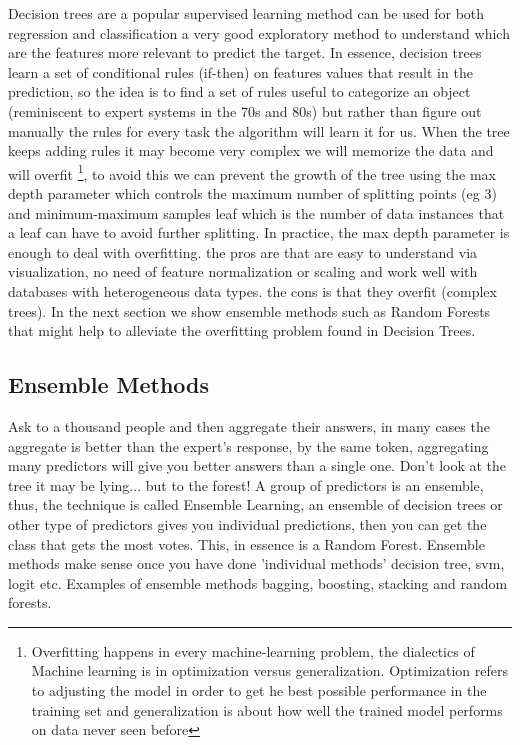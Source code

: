 \documentclass[11pt]{article}
\begin{document}
Decision trees are a popular supervised learning method can be used for both regression and classification  a very good exploratory method to understand which are the features more relevant to predict the target.
In essence, decision trees learn a set of conditional rules (if-then) on features values that result in the prediction, so the idea is to find a set of rules useful to categorize an object (reminiscent to expert systems in the 70s and 80s) but rather than figure out manually the rules for every task the algorithm will learn it for us.
When the tree keeps adding rules it may become very complex we will memorize the data and will overfit \footnote{Overfitting happens in every machine-learning problem, the dialectics of Machine learning is in optimization versus generalization. Optimization refers to adjusting the model in order to get he best possible performance in the training set and generalization is about how well the trained model performs on data never seen before}, to avoid this we can prevent the growth of the tree using the max depth parameter which controls the maximum number of splitting points (eg 3) and minimum-maximum samples leaf which is the number of data instances that a leaf can have to avoid further splitting.  In practice, the max depth parameter is enough to deal with overfitting.
the pros are that are easy to understand via visualization, no need of feature normalization or scaling and work well with databases with heterogeneous data types. the cons is that they overfit (complex trees). In the next section we show ensemble methods such as Random Forests that might help to alleviate the overfitting problem found in Decision Trees.

\subsection{Ensemble Methods}
Ask to a thousand people and then aggregate their answers, in many cases the aggregate is better than the expert's response, by the same token, aggregating many predictors will give you better answers than a single one.
Don't look at the tree it may be lying... but to the forest!
A group of predictors is an ensemble, thus, the technique is called Ensemble Learning, an ensemble of decision trees or other type of predictors gives you individual predictions, then you can get the class that gets the most votes. This, in essence is a Random Forest.
Ensemble methods make sense once you have done 'individual methods' decision tree, svm, logit etc. 
Examples of ensemble methods bagging, boosting, stacking and random forests.
\end{document}
